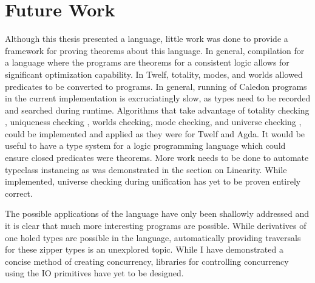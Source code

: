 \section{Future Work}

Although this thesis presented a language, little work was done to provide a framework
for proving theorems about this language. In general, compilation for a language
where the programs are theorems for a consistent logic allows for significant optimization
capability. In Twelf, totality, modes, and worlds allowed predicates to be converted
to programs. In general, running of Caledon programs in the current implementation
is excruciatingly slow, as types need to be recorded and searched during runtime. Algorithms
that take advantage of totality checking \citep{altenkirch2010termination}, 
uniqueness checking \citep{anderson2004verifying}, 
worlds checking\citep{anderson2004verifying}, 
mode checking\citep{anderson2004verifying}, 
and universe checking \citep{harper1991type}, 
could be implemented and applied as they were for Twelf and Agda.  It would be useful to have a type system for a logic programming
language which could ensure closed predicates were theorems. More work needs to be
done to automate typeclass instancing as was demonstrated in the section on Linearity.
While implemented, universe checking during unification has yet to be proven entirely
correct.

The possible applications of the language have only been shallowly addressed and
it is clear that much more interesting programs are possible. While derivatives of one
holed types are possible in the language, automatically providing traversals for these
zipper types is an unexplored topic. While I have demonstrated a concise method of
creating concurrency, libraries for controlling concurrency using the IO primitives have yet to be designed.

